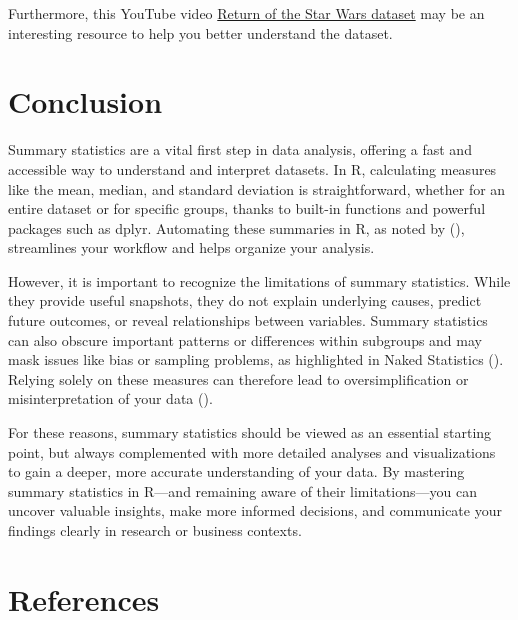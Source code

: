 \documentclass[
  man,
  floatsintext,
  longtable,
  nolmodern,
  notxfonts,
  notimes,
  colorlinks=true,linkcolor=blue,citecolor=blue,urlcolor=blue]{apa7}
\begin{document}
Furthermore, this YouTube video
\href{https://www.youtube.com/watch?v=4vSfbz9YMa0}{Return of the Star
Wars dataset} may be an interesting resource to help you better
understand the dataset.

\section{Conclusion}\label{conclusion}

Summary statistics are a vital first step in data analysis, offering a
fast and accessible way to understand and interpret datasets. In R,
calculating measures like the mean, median, and standard deviation is
straightforward, whether for an entire dataset or for specific groups,
thanks to built-in functions and powerful packages such as dplyr.
Automating these summaries in R, as noted by
(), streamlines your
workflow and helps organize your analysis.

However, it is important to recognize the limitations of summary
statistics. While they provide useful snapshots, they do not explain
underlying causes, predict future outcomes, or reveal relationships
between variables. Summary statistics can also obscure important
patterns or differences within subgroups and may mask issues like bias
or sampling problems, as highlighted in Naked Statistics
(). Relying solely on
these measures can therefore lead to oversimplification or
misinterpretation of your data
().

For these reasons, summary statistics should be viewed as an essential
starting point, but always complemented with more detailed analyses and
visualizations to gain a deeper, more accurate understanding of your
data. By mastering summary statistics in R---and remaining aware of
their limitations---you can uncover valuable insights, make more
informed decisions, and communicate your findings clearly in research or
business contexts.

\newpage

\section{References}\label{references}
\end{document}
